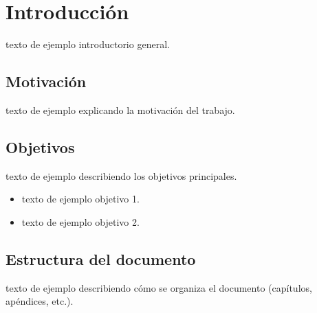 \chapter{Introducción}
\label{chap:intro}

texto de ejemplo introductorio general.

\section{Motivación}
texto de ejemplo explicando la motivación del trabajo.

\section{Objetivos}
texto de ejemplo describiendo los objetivos principales.
\begin{itemize}
    \item texto de ejemplo objetivo 1.
    \item texto de ejemplo objetivo 2.
\end{itemize}

\section{Estructura del documento}
texto de ejemplo describiendo cómo se organiza el documento (capítulos, apéndices, etc.).
